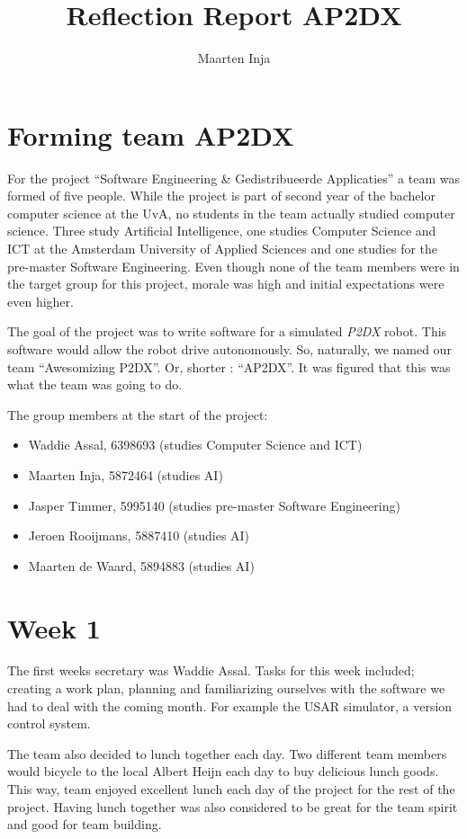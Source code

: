 \documentclass[a4paper,10pt]{article}
\title{Reflection Report AP2DX}
\author{Maarten Inja}
\begin{document}
\maketitle

\section{Forming team AP2DX}
For the project ``Software Engineering \& Gedistribueerde Applicaties'' a team was formed of five people. 
While the project is part of second year of the bachelor computer science at the UvA, no students in the 
team actually studied computer science. Three study Artificial Intelligence, one studies 
Computer Science and ICT at the Amsterdam University of Applied Sciences and one studies for the 
pre-master Software Engineering. Even though none of the team members were in the target group for this
project, morale was high and initial expectations were even higher.

The goal of the project was to write software for a simulated \emph{P2DX} robot. This software would
allow the robot drive autonomously. So, naturally, we named our team ``Awesomizing P2DX''. Or, shorter
: ``AP2DX''. It was
figured that this was what the team was going to do. 

The group members at the start of the project:
\begin{itemize}
    \item Waddie Assal, 6398693 (studies Computer Science and ICT) 
    \item Maarten Inja, 5872464 (studies AI)
    \item Jasper Timmer, 5995140 (studies pre-master Software Engineering)
    \item Jeroen Rooijmans, 5887410 (studies AI)
    \item Maarten de Waard, 5894883 (studies AI)
\end{itemize}

\section{Week 1}
The first weeks secretary was Waddie Assal. Tasks for this week included; creating a work plan, planning
and familiarizing ourselves with the software we had to deal with the coming month. For example the USAR simulator, 
a version control system. 

The team also decided to lunch together each day. Two different team members would bicycle to
the local Albert Heijn each day to buy delicious lunch goods. This way, team enjoyed excellent lunch
each day of the project for the rest of the project. Having lunch together was also considered to be great for the team spirit and good
for team building.
\end{document}
